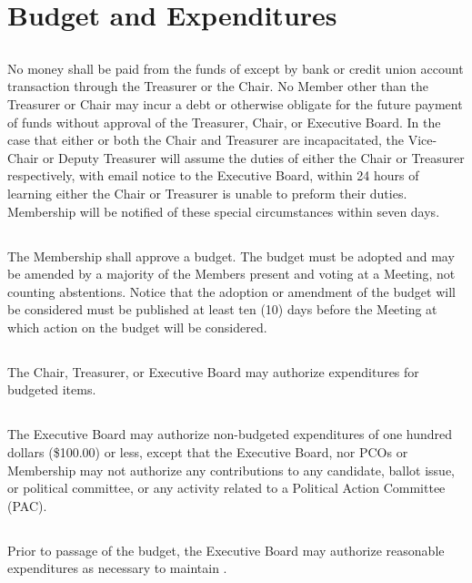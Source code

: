 \section{Budget and Expenditures}
\subsection{}
No money shall be paid from the funds of \thedistrict{} except by bank or credit union account transaction through the Treasurer or the Chair. No Member other than the Treasurer or Chair may incur a debt or otherwise obligate \thedistrict{} for the future payment of funds without approval of the Treasurer, Chair, or Executive Board. In the case that either or both the Chair and Treasurer are incapacitated, the Vice-Chair or Deputy Treasurer will assume the duties of either the Chair or Treasurer respectively, with email notice to the Executive Board, within 24 hours of learning either the Chair or Treasurer is unable to preform their duties. Membership will be notified of these special circumstances within seven days.

\subsection{}\label{budget-adoption}
The Membership shall approve a budget. The budget must be adopted and may be amended by a majority of the Members present and voting at a Meeting, not counting abstentions. Notice that the adoption or amendment of the budget will be considered must be published at least ten (10) days before the Meeting at which action on the budget will be considered.

\subsection{}
The Chair, Treasurer, or Executive Board may authorize expenditures for budgeted items.

\subsection{}
The Executive Board may authorize non-budgeted expenditures of one hundred dollars (\$100.00) or less, except that the Executive Board, nor PCOs or Membership may not authorize any contributions to any candidate, ballot issue, or political committee, or any activity related to a Political Action Committee (PAC).

\subsection{}
Prior to passage of the budget, the Executive Board may authorize reasonable expenditures as necessary to maintain \thedistrict{}.

